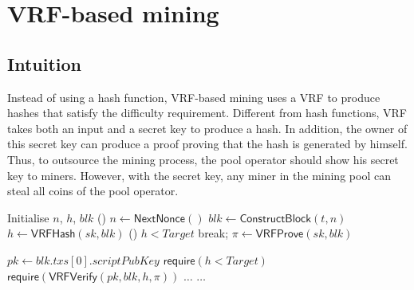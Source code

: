 \section{VRF-based mining}

\subsection{Intuition}
Instead of using a hash function, VRF-based mining uses a VRF to produce hashes that satisfy the difficulty requirement.
Different from hash functions, VRF takes both an input and a secret key to produce a hash.
In addition, the owner of this secret key can produce a proof proving that the hash is generated by himself.
Thus, to outsource the mining process, the pool operator should show his secret key to miners.
However, with the secret key, any miner in the mining pool can steal all coins of the pool operator.



\begin{algorithm}[]
\caption{$\mathsf{Work}(sk, t, Target)$.}
\label{algo:work}
\SetAlgoLined
{}
  Initialise $n$, $h$, $blk$ 
  \While () {$n \gets \mathsf{NextNonce}()$}{
    $blk \gets \mathsf{ConstructBlock}(t, n)$ 
    $h \gets \mathsf{VRFHash}(sk, blk)$ 
    \If () {$h < Target$}{
      break; 
    }
  }
  $\pi \gets \mathsf{VRFProve}(sk, blk)$ 
   
\end{algorithm}





\begin{algorithm}[h]
\caption{$\mathsf{Verify}(blk, h, \pi, Target)$}
\label{algo:verify}
\SetAlgoLined
$pk \gets blk . txs[0] . scriptPubKey$ 
$\mathsf{require}(h < Target)$ 
$\mathsf{require}(\mathsf{VRFVerify}(pk, blk, h, \pi))$ \;
$\dots$ 
$\dots$ 
\end{algorithm}


